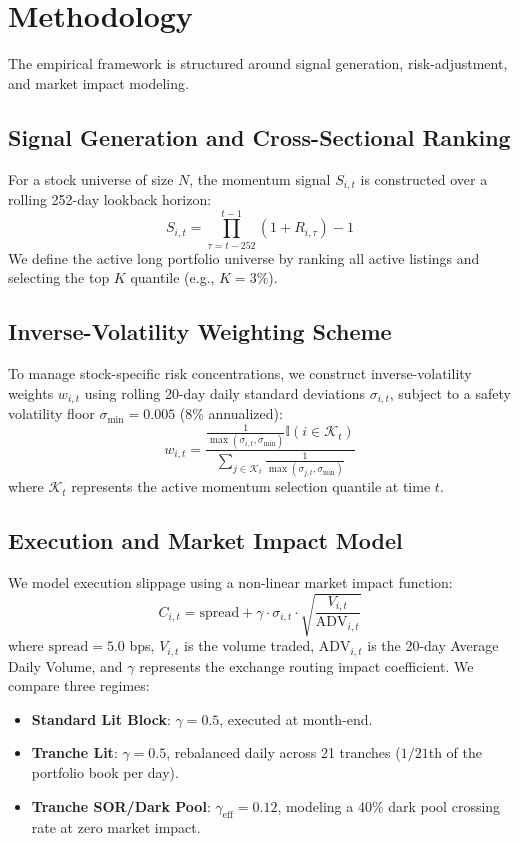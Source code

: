 \documentclass[12pt]{article}
\newcommand{\I}{\mathbb{I}}
\numberwithin{equation}{section}
\begin{document}
\section{Methodology}
The empirical framework is structured around signal generation, risk-adjustment, and market impact modeling.

\subsection{Signal Generation and Cross-Sectional Ranking}
For a stock universe of size $N$, the momentum signal $S_{i,t}$ is constructed over a rolling 252-day lookback horizon:
\begin{equation}
    S_{i,t} = \prod_{\tau=t-252}^{t-1} (1 + R_{i,\tau}) - 1
\end{equation}
We define the active long portfolio universe by ranking all active listings and selecting the top $K$ quantile (e.g., $K = 3\%$).

\subsection{Inverse-Volatility Weighting Scheme}
To manage stock-specific risk concentrations, we construct inverse-volatility weights $w_{i,t}$ using rolling 20-day daily standard deviations $\sigma_{i,t}$, subject to a safety volatility floor $\sigma_{\text{min}} = 0.005$ (8\% annualized):
\begin{equation}
    w_{i,t} = \frac{\frac{1}{\max(\sigma_{i,t}, \sigma_{\text{min}})} \I(i \in \mathcal{K}_t)}{\sum_{j \in \mathcal{K}_t} \frac{1}{\max(\sigma_{j,t}, \sigma_{\text{min}})}}
\end{equation}
where $\mathcal{K}_t$ represents the active momentum selection quantile at time $t$.

\subsection{Execution and Market Impact Model}
We model execution slippage using a non-linear market impact function:
\begin{equation}
    C_{i,t} = \text{spread} + \gamma \cdot \sigma_{i,t} \cdot \sqrt{\frac{V_{i,t}}{\text{ADV}_{i,t}}}
\end{equation}
where $\text{spread} = 5.0$ bps, $V_{i,t}$ is the volume traded, $\text{ADV}_{i,t}$ is the 20-day Average Daily Volume, and $\gamma$ represents the exchange routing impact coefficient. We compare three regimes:
\begin{itemize}
    \item \textbf{Standard Lit Block}: $\gamma = 0.5$, executed at month-end.
    \item \textbf{Tranche Lit}: $\gamma = 0.5$, rebalanced daily across 21 tranches ($1/21$th of the portfolio book per day).
    \item \textbf{Tranche SOR/Dark Pool}: $\gamma_{\text{eff}} = 0.12$, modeling a 40\% dark pool crossing rate at zero market impact.
\end{itemize}
\end{document}
